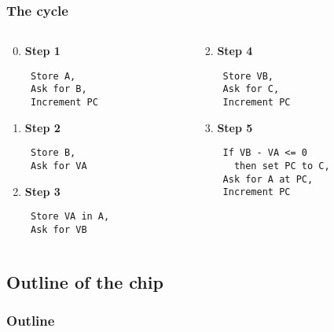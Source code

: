 \documentclass[slidestop]{beamer}
\begin{document}
\begin{frame}[fragile]
    \frametitle{The cycle}

    \begin{columns}[t]
        \begin{column}[T]{5cm}
    \begin{enumerate}
            \setcounter{enumi}{-1}

        \item \textbf{Step 1}
            \begin{lstlisting}
 Store A,
 Ask for B,
 Increment PC
            \end{lstlisting}
        \item \textbf{Step 2}
            \begin{lstlisting}
 Store B,
 Ask for VA
            \end{lstlisting}

        \item \textbf{Step 3}
            \begin{lstlisting}
 Store VA in A,
 Ask for VB
            \end{lstlisting}

    \end{enumerate}
\end{column}
\begin{column}[T]{5cm}
    \begin{enumerate}
        \setcounter{enumi}{1}
        \item \textbf{Step 4}
            \begin{lstlisting}
 Store VB,
 Ask for C,
 Increment PC
            \end{lstlisting}

        \item \textbf{Step 5}
            \begin{lstlisting}
 If VB - VA <= 0
   then set PC to C,
 Ask for A at PC,
 Increment PC
             \end{lstlisting}
    \end{enumerate}
\end{column}
\end{columns}

\end{frame}

\subsection{Outline of the chip}
\begin{frame}
    \frametitle{Outline}
    
\end{frame}
\end{document}
